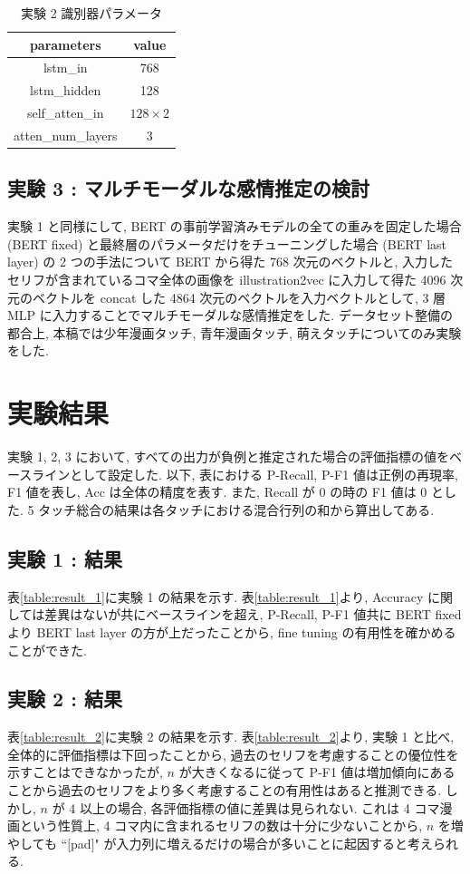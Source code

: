 \documentclass[twocolumn]{jarticle}     %
\begin{document}
\begin{table}[bht]
\begin{center}
\caption{実験 2 識別器パラメータ}
\begin{tabular}{|c|c|}
\hline
parameters & value \\ \hline
lstm\_in & 768   \\ \hline
lstm\_hidden    & 128    \\ \hline
self\_atten\_in & $128 \times 2$   \\ \hline
atten\_num\_layers & 3     \\ \hline
\end{tabular}
\label{tab:self_net}
\end{center}
\end{table}

\subsection{\small{実験 3 : マルチモーダルな感情推定の検討}}
実験 1 と同様にして, BERT の事前学習済みモデルの全ての重みを固定した場合 (BERT fixed) と最終層のパラメータだけをチューニングした場合 (BERT last layer) の 2 つの手法について BERT から得た 768 次元のベクトルと, 入力したセリフが含まれているコマ全体の画像を illustration2vec に入力して得た 4096 次元のベクトルを concat した 4864 次元のベクトルを入力ベクトルとして, 3 層 MLP に入力することでマルチモーダルな感情推定をした. データセット整備の都合上, 本稿では少年漫画タッチ, 青年漫画タッチ, 萌えタッチについてのみ実験をした.

\section{実験結果}
実験 1, 2, 3 において, すべての出力が負例と推定された場合の評価指標の値をベースラインとして設定した. 以下, 表における P-Recall, P-F1 値は正例の再現率, F1 値を表し, Acc は全体の精度を表す. また, Recall が 0 の時の F1 値は 0 とした. 5 タッチ総合の結果は各タッチにおける混合行列の和から算出してある.

\subsection{実験 1 : 結果}
表\ref{table:result_1}に実験 1 の結果を示す.
表\ref{table:result_1}より, Accuracy に関しては差異はないが共にベースラインを超え, P-Recall, P-F1 値共に BERT fixed より BERT last layer の方が上だったことから, fine tuning の有用性を確かめることができた.

\subsection{実験 2 : 結果}
表\ref{table:result_2}に実験 2 の結果を示す.
表\ref{table:result_2}より, 実験 1 と比べ, 全体的に評価指標は下回ったことから, 過去のセリフを考慮することの優位性を示すことはできなかったが, $n$ が大きくなるに従って P-F1 値は増加傾向にあることから過去のセリフをより多く考慮することの有用性はあると推測できる. しかし, $n$ が 4 以上の場合, 各評価指標の値に差異は見られない. これは 4 コマ漫画という性質上, 4 コマ内に含まれるセリフの数は十分に少ないことから, $n$ を増やしても ``$[$pad$]$" が入力列に増えるだけの場合が多いことに起因すると考えられる.
\end{document}
